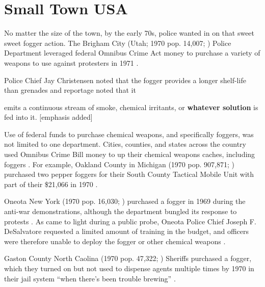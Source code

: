 \documentclass[
  11pt,
]{krantz}
\renewenvironment{quote}{\begin{VF}}{\end{VF}}
\begin{document}
\hypertarget{small-town-usa}{%
\section*{Small Town USA}\label{small-town-usa}}


No matter the size of the town, by the early 70s, police wanted in on that sweet sweet fogger action.
The Brigham City (Utah; 1970 pop. 14,007; \citet{USCB1970}) Police Department leveraged federal Omnibus Crime Act money to purchase a variety of weapons to use against protesters in 1971 \citep{BoxElderAgencies1971}.

Police Chief Jay Christensen noted that the fogger provides a longer shelf-life than grenades and reportage noted that it

\begin{quote}
emits a continuous stream of smoke, chemical irritants, or \textbf{whatever solution} is fed into it. {[}emphasis added{]}

\end{quote}

Use of federal funds to purchase chemical weapons, and specifically foggers, was not limited to one department.
Cities, counties, and states across the country used Omnibus Crime Bill money to up their chemical weapons caches, including foggers \citep{Conheim1972}.
For example, Oakland County in Michigan (1970 pop. 907,871; \citet{USCB1970}) purchased two pepper foggers for their South County Tactical Mobile Unit with part of their \$21,066 in 1970 \citep{Conheim1972}.

Oneota New York (1970 pop. 16,030; \citet{USCB1970}) purchased a fogger in 1969 during the anti-war demonstrations, although the department bungled its response to protests \citep{Griffin1973}.
As came to light during a public probe, Oneota Police Chief Joseph F. DeSalvatore requested a limited amount of training in the budget, and officers were therefore unable to deploy the fogger or other chemical weapons \citep{Griffin1973}.

Gaston County North Caolina (1970 pop. 47,322; \citet{USCB1970}) Sheriffs purchased a fogger, which they turned on but not used to dispense agents multiple times by 1970 in their jail system ``when there's been trouble brewing'' \citep{Balloch1970}.
\end{document}
